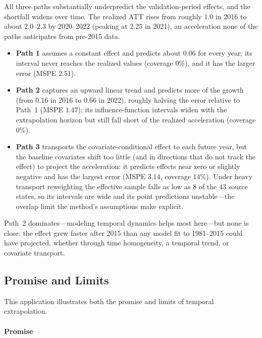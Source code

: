 \documentclass{article}
\begin{document}
All three paths substantially underpredict the validation-period effects, and the shortfall widens over time. The realized ATT rises from roughly $1.0$ in 2016 to about $2.0$--$2.3$ by 2020--2022 (peaking at $2.25$ in 2021), an acceleration none of the paths anticipates from pre-2015 data.
\begin{itemize}
\item \textbf{Path 1} assumes a constant effect and predicts about $0.06$ for every year; its interval never reaches the realized values (coverage $0\%$), and it has the larger error (MSPE $2.51$).
\item \textbf{Path 2} captures an upward linear trend and predicts more of the growth (from $0.16$ in 2016 to $0.66$ in 2022), roughly halving the error relative to Path~1 (MSPE $1.47$); its influence-function intervals widen with the extrapolation horizon but still fall short of the realized acceleration (coverage $0\%$).
\item \textbf{Path 3} transports the covariate-conditional effect to each future year, but the baseline covariates shift too little (and in directions that do not track the effect) to project the acceleration: it predicts effects near zero or slightly negative and has the largest error (MSPE $3.14$, coverage $14\%$). Under heavy transport reweighting the effective sample falls as low as $8$ of the $43$ source states, so its intervals are wide and its point predictions unstable---the overlap limit the method's assumptions make explicit.
\end{itemize}
Path~2 dominates---modeling temporal dynamics helps most here---but none is close: the effect grew faster after 2015 than any model fit to 1981--2015 could have projected, whether through time homogeneity, a temporal trend, or covariate transport.

\subsection{Promise and Limits}


This application illustrates both the promise and limits of temporal extrapolation.

\paragraph{Promise}
\end{document}
